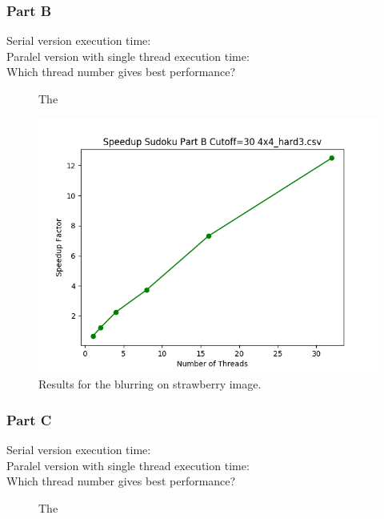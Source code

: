 \documentclass{article}
\begin{document}
\newpage

\subsubsection{Part B}
\begin{description}
\item[Serial version execution time: ] 
\item[Paralel version with single thread execution time: ]
\item[Which thread number gives best performance?]
The
\end{description} 
\begin{figure}[!htb]
        \centering
        \includegraphics[width=1\linewidth]{./img/speedup_part_2_B.png}
        \caption{Results for the blurring on strawberry image.}
\end{figure}

\newpage

\subsubsection{Part C}
\begin{description}
\item[Serial version execution time: ] 
\item[Paralel version with single thread execution time: ]
\item[Which thread number gives best performance?]
The
\end{description} 
\end{document}
